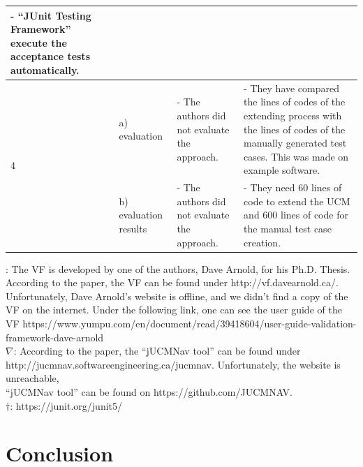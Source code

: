 \begin{landscape}
\begin{small}
\begin{table}
\begin{longtable}[h]{p{1.3cm}|>{\raggedright}p{2.6cm}|>{}p{9.2cm}|>{}p{9.2cm}}
			- \enquote{JUnit Testing Framework} execute the acceptance tests automatically.
			\\
			\cline{2-4}
			\hline %
			\multirow{2}{*}{4 \rotatebox[origin=r]{90}{\textbf{Quality}}} 
			& a) evaluation
			& - The authors did not evaluate the approach. 
			& - They have compared the lines of codes of the extending process with the lines of codes of the manually generated test cases. This was made on example software. 
			\\
			\cline{2-4}
			& b) evaluation results 
			&- The authors did not evaluate the approach. &
			- They need 60 lines of code to extend the UCM and 600 lines of code for the manual test case creation. \\
			\cline{2-4}
			\hline %
		\end{longtable}
		\qquad \qquad *: The VF is developed by one of the authors, Dave Arnold, for his Ph.D. Thesis. According to the paper, the VF can be found under http://vf.davearnold.ca/.\\
		\null \qquad \qquad \quad Unfortunately, Dave Arnold's website is offline, and we didn't find a copy of the VF on the internet. Under the following link, one can see the user guide of the \\
		\null \qquad \qquad \quad VF https://www.yumpu.com/en/document/read/39418604/user-guide-validation-framework-dave-arnold \\
		\null \qquad \qquad $\nabla$: According to the paper, the \enquote{jUCMNav tool} can be found under http://jucmnav.softwareengineering.ca/jucmnav. Unfortunately, the website is unreachable, \\
		\null \qquad \qquad \quad \enquote{jUCMNav tool} can be found on https://github.com/JUCMNAV.\\
		\null \qquad \qquad $\dagger$: https://junit.org/junit5/
		\label{tab:08_syntheseMatrix2}
	\end{table}
	\end{small}
\end{landscape}
\restoregeometry
\section{Conclusion}

